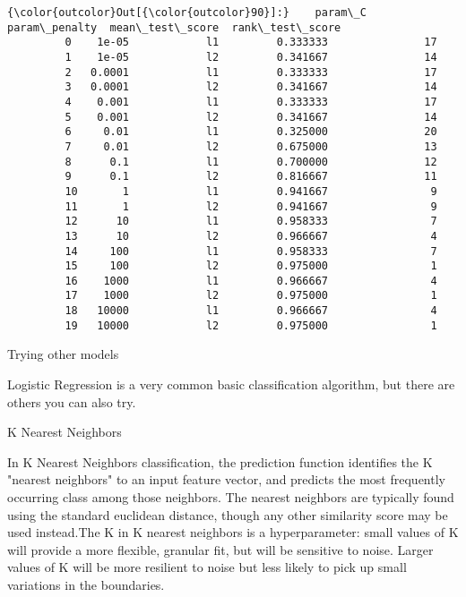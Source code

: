 \documentclass[8pt]{extarticle}
\begin{document}
\begin{Verbatim}[commandchars=\\\{\}]
{\color{outcolor}Out[{\color{outcolor}90}]:}    param\_C param\_penalty  mean\_test\_score  rank\_test\_score
         0    1e-05            l1         0.333333               17
         1    1e-05            l2         0.341667               14
         2   0.0001            l1         0.333333               17
         3   0.0001            l2         0.341667               14
         4    0.001            l1         0.333333               17
         5    0.001            l2         0.341667               14
         6     0.01            l1         0.325000               20
         7     0.01            l2         0.675000               13
         8      0.1            l1         0.700000               12
         9      0.1            l2         0.816667               11
         10       1            l1         0.941667                9
         11       1            l2         0.941667                9
         12      10            l1         0.958333                7
         13      10            l2         0.966667                4
         14     100            l1         0.958333                7
         15     100            l2         0.975000                1
         16    1000            l1         0.966667                4
         17    1000            l2         0.975000                1
         18   10000            l1         0.966667                4
         19   10000            l2         0.975000                1
\end{Verbatim}
            
    Trying other models

Logistic Regression is a very common basic classification algorithm, but
there are others you can also try.

K Nearest Neighbors

In K Nearest Neighbors classification, the prediction function
identifies the K "nearest neighbors" to an input feature vector, and
predicts the most frequently occurring class among those neighbors. The
nearest neighbors are typically found using the standard euclidean
distance, though any other similarity score may be used instead.The K in
K nearest neighbors is a hyperparameter: small values of K will provide
a more flexible, granular fit, but will be sensitive to noise. Larger
values of K will be more resilient to noise but less likely to pick up
small variations in the boundaries.
\end{document}
